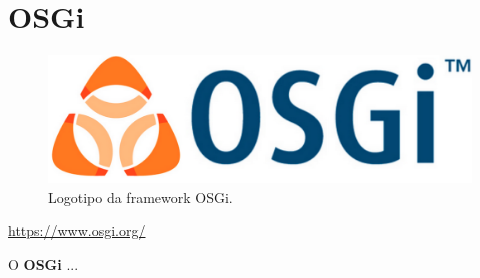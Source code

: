 \section{OSGi}
\label{subsec:osgi}

\begin{figure}[H]
    \centering
    \includegraphics[scale=0.08]{images/osgi.png}
    \caption{Logotipo da framework OSGi.}
    \label{fig:osgi}
\end{figure}

\href{https://www.osgi.org/}{https://www.osgi.org/}

\hspace{5mm} O \textbf{OSGi} ...
